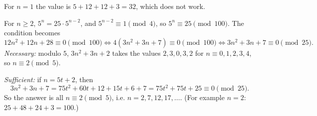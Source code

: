 For $n=1$ the value is $5+12+12+3=32$, which does not work.

For $n\ge2$, $5^n=25\cdot5^{n-2}$, and $5^{n-2}\equiv1\pmod4$, so $5^n\equiv25\pmod{100}$. The condition becomes
\[12n^2+12n+28\equiv0\pmod{100}\iff4\left(3n^2+3n+7\right)\equiv0\pmod{100}\iff3n^2+3n+7\equiv0\pmod{25}.\]
\emph{Necessary:} modulo $5$, $3n^2+3n+2$ takes the values $2,3,0,3,2$ for $n\equiv0,1,2,3,4$, so $n\equiv2\pmod5$.

\emph{Sufficient:} if $n=5t+2$, then
\[3n^2+3n+7=75t^2+60t+12+15t+6+7=75t^2+75t+25\equiv0\pmod{25}.\]
So the answer is $\boxed{\text{all }n\equiv2\pmod5}$, i.e. $n=2,7,12,17,\dots$. (For example $n=2$: $25+48+24+3=100$.)
